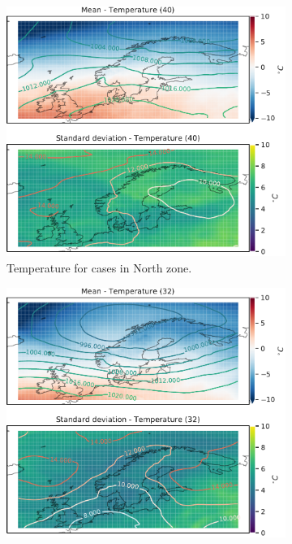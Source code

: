 \begin{figure}
\begin{subfigure}[b]{0.49\textwidth}
    \centering
    \includegraphics[width=\textwidth]{Figures/TempNord.pdf}
    \caption{Temperature for cases in North zone.}
    \label{fig:NordTemperature}
\end{subfigure}
\begin{subfigure}[b]{0.49\textwidth}
    \centering
    \includegraphics[width=\textwidth]{Figures/TempNordvest.pdf}

\end{subfigure}
\end{figure}
